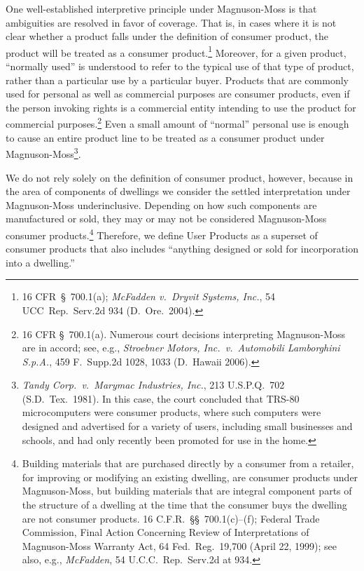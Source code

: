 One well-established interpretive principle under Magnuson-Moss is that
ambiguities are resolved in favor of coverage.  That is, in cases where
it is not clear whether a product falls under the definition of consumer
product, the product will be treated as a consumer product.\footnote{16
CFR~\S\ 700.1(a); \textit{McFadden v.~Dryvit Systems, Inc.}, 54
UCC~Rep.~Serv.2d 934 (D.~Ore.~2004).}  Moreover, for a given product,
``normally used'' is understood to refer to the typical use of that type
of product, rather than a particular use by a particular buyer.
Products that are commonly used for personal as well as commercial
purposes are consumer products, even if the person invoking rights is a
commercial entity intending to use the product for commercial
purposes.\footnote{16 CFR \S \ 700.1(a).  Numerous court decisions
interpreting Magnuson-Moss are in accord; see, e.g., \textit{Stroebner
Motors, Inc.~v.~Automobili Lamborghini S.p.A.}, 459 F.~Supp.2d 1028,
1033 (D.~Hawaii 2006).}  Even a small amount of ``normal'' personal use
is enough to cause an entire product line to be treated as a consumer
product under Magnuson-Moss\footnote{\textit{Tandy Corp.~v.~Marymac
Industries, Inc.}, 213 U.S.P.Q.~702 (S.D.~Tex.~1981). In this case, the
court concluded that TRS-80 microcomputers were consumer products, where
such computers were designed and advertised for a variety of users,
including small businesses and schools, and had only recently been
promoted for use in the home.}.

We do not rely solely on the definition of consumer product, however,
because in the area of components of dwellings we consider the settled
interpretation under Magnuson-Moss underinclusive.  Depending on how
such components are manufactured or sold, they may or may not be
considered Magnuson-Moss consumer products.\footnote{Building materials
that are purchased directly by a consumer from a retailer, for improving
or modifying an existing dwelling, are consumer products under
Magnuson-Moss, but building materials that are integral component parts
of the structure of a dwelling at the time that the consumer buys the
dwelling are not consumer products. 16 C.F.R.~\S\S~700.1(c)--(f);
Federal Trade Commission, Final Action Concerning Review of
Interpretations of Magnuson-Moss Warranty Act, 64 Fed.~Reg.~19,700
(April 22, 1999); see also, e.g., \textit{McFadden}, 54
U.C.C.~Rep.~Serv.2d at 934.}  Therefore, we define User Products as a
superset of consumer products that also includes ``anything designed or
sold for incorporation into a dwelling.''

